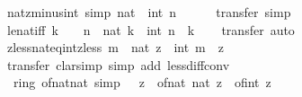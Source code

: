 \begin{isabellebody}
\endisatagproof
{\isafoldproof}%
%
\isadelimproof
\isanewline
%
\endisadelimproof
\isanewline
{}\isamarkupfalse%
\ nat{\isacharunderscore}{\kern0pt}zminus{\isacharunderscore}{\kern0pt}int\ {\isacharbrackleft}{\kern0pt}simp{\isacharbrackright}{\kern0pt}{\isacharcolon}{\kern0pt}\ {\isachardoublequoteopen}nat\ {\isacharparenleft}{\kern0pt}{\isacharminus}{\kern0pt}\ int\ n{\isacharparenright}{\kern0pt}\ {\isacharequal}{\kern0pt}\ {}{\isachardoublequoteclose}\isanewline
%
\isadelimproof
\ \ %
\endisadelimproof
%
\isatagproof
{}\isamarkupfalse%
\ transfer\ simp%
\endisatagproof
{\isafoldproof}%
%
\isadelimproof
\isanewline
%
\endisadelimproof
\isanewline
{}\isamarkupfalse%
\ le{\isacharunderscore}{\kern0pt}nat{\isacharunderscore}{\kern0pt}iff{\isacharcolon}{\kern0pt}\ {\isachardoublequoteopen}k\ {\isasymge}\ {}\ {\isasymLongrightarrow}\ n\ {\isasymle}\ nat\ k\ {\isasymlongleftrightarrow}\ int\ n\ {\isasymle}\ k{\isachardoublequoteclose}\isanewline
%
\isadelimproof
\ \ %
\endisadelimproof
%
\isatagproof
{}\isamarkupfalse%
\ transfer\ auto%
\endisatagproof
{\isafoldproof}%
%
\isadelimproof
\isanewline
%
\endisadelimproof
\isanewline
{}\isamarkupfalse%
\ zless{\isacharunderscore}{\kern0pt}nat{\isacharunderscore}{\kern0pt}eq{\isacharunderscore}{\kern0pt}int{\isacharunderscore}{\kern0pt}zless{\isacharcolon}{\kern0pt}\ {\isachardoublequoteopen}m\ {\isacharless}{\kern0pt}\ nat\ z\ {\isasymlongleftrightarrow}\ int\ m\ {\isacharless}{\kern0pt}\ z{\isachardoublequoteclose}\isanewline
%
\isadelimproof
\ \ %
\endisadelimproof
%
\isatagproof
{}\isamarkupfalse%
\ transfer\ {\isacharparenleft}{\kern0pt}clarsimp\ simp\ add{\isacharcolon}{\kern0pt}\ less{\isacharunderscore}{\kern0pt}diff{\isacharunderscore}{\kern0pt}conv{\isacharparenright}{\kern0pt}%
\endisatagproof
{\isafoldproof}%
%
\isadelimproof
\isanewline
%
\endisadelimproof
\isanewline
{}\isamarkupfalse%
\ {\isacharparenleft}{\kern0pt}\ ring{\isacharunderscore}{\kern0pt}{}{\isacharparenright}{\kern0pt}\ of{\isacharunderscore}{\kern0pt}nat{\isacharunderscore}{\kern0pt}nat\ {\isacharbrackleft}{\kern0pt}simp{\isacharbrackright}{\kern0pt}{\isacharcolon}{\kern0pt}\ {\isachardoublequoteopen}{}\ {\isasymle}\ z\ {\isasymLongrightarrow}\ of{\isacharunderscore}{\kern0pt}nat\ {\isacharparenleft}{\kern0pt}nat\ z{\isacharparenright}{\kern0pt}\ {\isacharequal}{\kern0pt}\ of{\isacharunderscore}{\kern0pt}int\ z{\isachardoublequoteclose}\isanewline
%
\isadelimproof
\ \ %
\endisadelimproof

\end{isabellebody}
